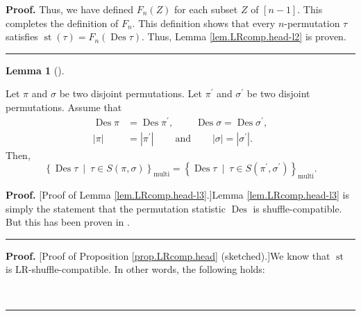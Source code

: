 \documentclass[numbers=enddot,12pt,final,onecolumn,notitlepage]{scrartcl}%
\theoremstyle{definition}
\newtheorem{lem}[theo]{Lemma}
\newenvironment{lemma}[1][]
{\begin{lem}[#1]\begin{leftbar}}
{\end{leftbar}\end{lem}}
\newenvironment{proof}[1][Proof]{\noindent\textbf{#1.} }{\ \rule{0.5em}{0.5em}}
\newenvironment{verlong}{}{}
\begin{document}
\begin{verlong}
\begin{proof}
Thus, we have defined $F_{n}\left(  Z\right)  $ for each subset $Z$ of
$\left[  n-1\right]  $. This completes the definition of $F_{n}$. This
definition shows that every $n$-permutation $\tau$ satisfies
$\operatorname*{st}\left(  \tau\right)  =F_{n}\left(  \operatorname*{Des}%
\tau\right)  $. Thus, Lemma \ref{lem.LRcomp.head-l2} is proven.
\end{proof}

\begin{lemma}
\label{lem.LRcomp.head-l3}Let $\pi$ and $\sigma$ be two disjoint permutations.
Let $\pi^{\prime}$ and $\sigma^{\prime}$ be two disjoint permutations. Assume
that%
\begin{align*}
\operatorname*{Des}\pi &  =\operatorname*{Des}\pi^{\prime}%
,\ \ \ \ \ \ \ \ \ \ \operatorname*{Des}\sigma=\operatorname*{Des}%
\sigma^{\prime},\\
\left\vert \pi\right\vert  &  =\left\vert \pi^{\prime}\right\vert
\ \ \ \ \ \ \ \ \ \ \text{and}\ \ \ \ \ \ \ \ \ \ \left\vert \sigma\right\vert
=\left\vert \sigma^{\prime}\right\vert .
\end{align*}
Then,
\[
\left\{  \operatorname*{Des}\tau\ \mid\ \tau\in S\left(  \pi,\sigma\right)
\right\}  _{\operatorname*{multi}}=\left\{  \operatorname*{Des}\tau
\ \mid\ \tau\in S\left(  \pi^{\prime},\sigma^{\prime}\right)  \right\}
_{\operatorname*{multi}}.
\]

\end{lemma}

\begin{proof}
[Proof of Lemma \ref{lem.LRcomp.head-l3}.]Lemma \ref{lem.LRcomp.head-l3} is
simply the statement that the permutation statistic $\operatorname*{Des}$ is
shuffle-compatible. But this has been proven in \cite[\S 2.4]{part1}.
\end{proof}

\begin{proof}
[Proof of Proposition \ref{prop.LRcomp.head} (sketched).]We know that
$\operatorname*{st}$ is LR-shuffle-compatible. In other words, the following holds:


\end{proof}
\end{verlong}
\end{document}
